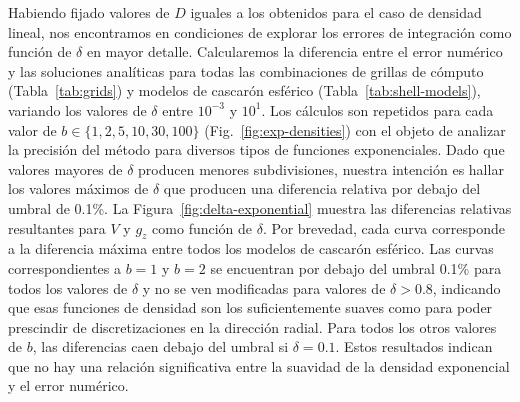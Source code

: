 Habiendo fijado valores de $D$ iguales a los obtenidos para el caso de
densidad lineal, nos encontramos en condiciones de explorar los errores de
integración como función de $\delta$ en mayor detalle.
Calcularemos la diferencia entre el error numérico y las soluciones analíticas
para todas las combinaciones de grillas de cómputo (Tabla~\ref{tab:grids})
y modelos de cascarón esférico (Tabla~\ref{tab:shell-models}),
variando los valores de $\delta$ entre $10^{-3}$ y $10^{1}$.
Los cálculos son repetidos para cada valor de $b \in \{1, 2, 5, 10, 30, 100\}$
(Fig.~\ref{fig:exp-densities}) con el objeto de analizar la precisión del
método para diversos tipos de funciones exponenciales.
Dado que valores mayores de $\delta$ producen menores subdivisiones, nuestra
intención es hallar los valores máximos de $\delta$ que producen una diferencia
relativa por debajo del umbral de 0.1\%.
La Figura~\ref{fig:delta-exponential} muestra las diferencias relativas
resultantes para $V$ y $g_z$ como función de $\delta$.
Por brevedad, cada curva corresponde a la diferencia máxima entre todos los
modelos de cascarón esférico.
Las curvas correspondientes a $b=1$ y $b=2$ se encuentran por debajo del umbral
0.1\% para todos los valores de $\delta$ y no se ven modificadas para valores
de $\delta > 0.8$, indicando que esas funciones de densidad son los
suficientemente suaves como para poder prescindir de discretizaciones en la
dirección radial.
Para todos los otros valores de $b$, las diferencias caen debajo del umbral si
$\delta=0.1$.
Estos resultados indican que no hay una relación significativa entre la
suavidad de la densidad exponencial y el error numérico.

